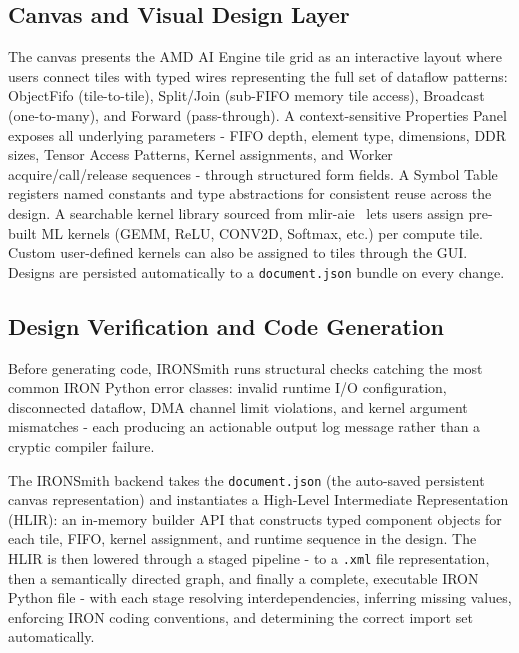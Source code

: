 \vspace{-2mm}
\subsection{Canvas and Visual Design Layer}
\vspace{-3mm}

The canvas presents the AMD AI Engine tile grid as an interactive layout where users connect tiles with typed wires representing the full set of dataflow patterns: ObjectFifo (tile-to-tile), Split/Join (sub-FIFO memory tile access), Broadcast (one-to-many), and Forward (pass-through). A context-sensitive Properties Panel exposes all underlying parameters - FIFO depth, element type, dimensions, DDR sizes, Tensor Access Patterns, Kernel assignments, and Worker acquire/call/release sequences - through structured form fields. A Symbol Table registers named constants and type abstractions for consistent reuse across the design. A searchable kernel library sourced from mlir-aie~\cite{mliraie} lets users assign pre-built ML kernels (GEMM, ReLU, CONV2D, Softmax, etc.) per compute tile. Custom user-defined kernels can also be assigned to tiles through the GUI.
Designs are persisted automatically to a \texttt{document.json} bundle on every change.

\vspace{-2mm}
\subsection{Design Verification and Code Generation}
\vspace{-3mm}

Before generating code, IRONSmith runs structural checks catching the most common IRON Python error classes: invalid runtime I/O configuration, disconnected dataflow, DMA channel limit violations, and kernel argument mismatches - each producing an actionable output log message rather than a cryptic compiler failure.

The IRONSmith backend takes the \texttt{document.json} (the auto-saved persistent canvas representation) and instantiates a High-Level Intermediate Representation (HLIR): an in-memory builder API that constructs typed component objects for each tile, FIFO, kernel assignment, and runtime sequence in the design. The HLIR is then lowered through a staged pipeline - to a \texttt{.xml} file representation, then a semantically directed graph, and finally a complete, executable IRON Python file - with each stage resolving interdependencies, inferring missing values, enforcing IRON coding conventions, and determining the correct import set automatically.

\vspace{-2mm}
